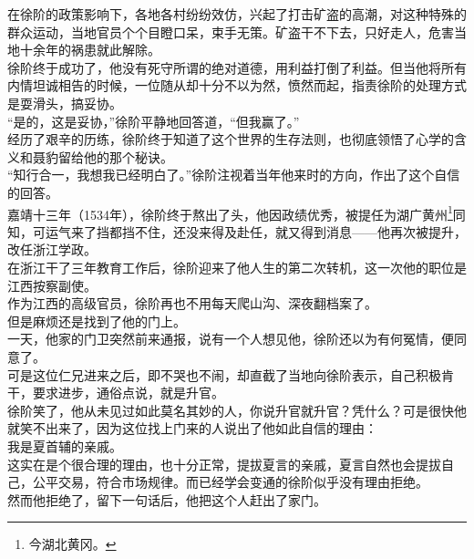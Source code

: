 \begin{multicols}{\theparacolNo}
在徐阶的政策影响下，各地各村纷纷效仿，兴起了打击矿盗的高潮，对这种特殊的群众运动，当地官员个个目瞪口呆，束手无策。矿盗干不下去，只好走人，危害当地十余年的祸患就此解除。\\

徐阶终于成功了，他没有死守所谓的绝对道德，用利益打倒了利益。但当他将所有内情坦诚相告的时候，一位随从却十分不以为然，愤然而起，指责徐阶的处理方式是耍滑头，搞妥协。\\

“是的，这是妥协，”徐阶平静地回答道，“但我赢了。”\\

经历了艰辛的历练，徐阶终于知道了这个世界的生存法则，也彻底领悟了心学的含义和聂豹留给他的那个秘诀。\\

“知行合一，我想我已经明白了。”徐阶注视着当年他来时的方向，作出了这个自信的回答。\\

嘉靖十三年（1534年），徐阶终于熬出了头，他因政绩优秀，被提任为湖广黄州\footnote{今湖北黄冈。}同知，可运气来了挡都挡不住，还没来得及赴任，就又得到消息——他再次被提升，改任浙江学政。\\

在浙江干了三年教育工作后，徐阶迎来了他人生的第二次转机，这一次他的职位是江西按察副使。\\

作为江西的高级官员，徐阶再也不用每天爬山沟、深夜翻档案了。\\

但是麻烦还是找到了他的门上。\\

一天，他家的门卫突然前来通报，说有一个人想见他，徐阶还以为有何冤情，便同意了。\\

可是这位仁兄进来之后，即不哭也不闹，却直截了当地向徐阶表示，自己积极肯干，要求进步，通俗点说，就是升官。\\

徐阶笑了，他从未见过如此莫名其妙的人，你说升官就升官？凭什么？可是很快他就笑不出来了，因为这位找上门来的人说出了他如此自信的理由：\\

我是夏首辅的亲戚。\\

这实在是个很合理的理由，也十分正常，提拔夏言的亲戚，夏言自然也会提拔自己，公平交易，符合市场规律。而已经学会变通的徐阶似乎没有理由拒绝。\\

然而他拒绝了，留下一句话后，他把这个人赶出了家门。\\


\end{multicols}

